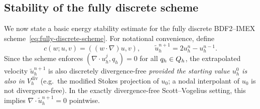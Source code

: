\documentclass[11pt]{article}
\newtheorem{lemma}{Lemma}
\theoremstyle{remark}\newtheorem{remark}{Remark}
\newcommand{\Vdivh}{V_h^{\mathrm{div}}}
\newcommand{\tu}{\tilde u_h}
\theoremstyle{plain}
\begin{document}
\subsection{Stability of the fully discrete scheme}
We now state a basic energy stability estimate for the fully discrete BDF2--IMEX scheme~\eqref{eq:fully-discrete-scheme}. For notational convenience, define
\[c(w;u,v)=((w\cdot\nabla)u,v),\qquad\tu^{n+1}=2u_h^n-u_h^{n-1}.\]
Since the scheme enforces $(\nabla\cdot u_h^j,q_h)=0$ for all $q_h\in Q_h$, the extrapolated velocity $\tu^{n+1}$ is also discretely divergence-free \emph{provided the starting value $u_h^0$ is also in $\Vdivh$} (e.g.\ the modified Stokes projection of $u_0$; a nodal interpolant of $u_0$ is not divergence-free). In the exactly divergence-free Scott--Vogelius setting, this implies $\nabla\cdot\tu^{n+1}=0$ pointwise.

\end{document}
